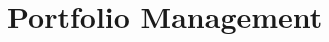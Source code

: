 \section{Portfolio Management}



\newpage



\newpage



\newpage



\newpage



\newpage



\newpage



